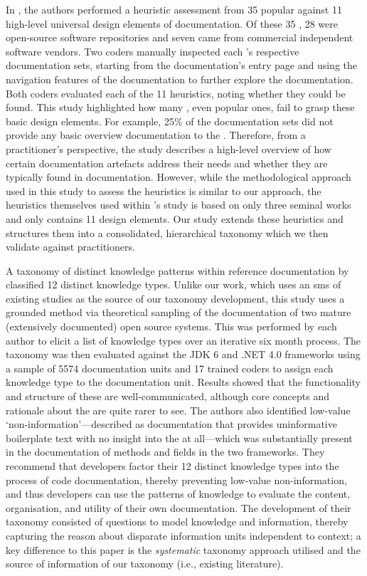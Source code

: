 In \citet{Watson:2012uy}, the authors performed a heuristic assessment from 35 popular  against 11 high-level universal design elements of  documentation. Of these 35 , 28 were open-source software repositories and seven came from commercial independent software vendors. Two coders manually inspected each 's respective documentation sets, starting from the documentation's entry page and using the navigation features of the documentation to further explore the documentation. Both coders evaluated each of the 11 heuristics, noting whether they could be found. This study highlighted how many , even popular ones, fail to grasp these basic design elements. For example, 25\% of the documentation sets did not provide any basic overview documentation to the . Therefore, from a practitioner's perspective, the study describes a high-level overview of how certain documentation artefacts address their needs and whether they are typically found in documentation. However, while the methodological approach used in this study to assess the heuristics is similar to our approach, the heuristics themselves used within \citeauthor{Watson:2012uy}'s study is based on only three seminal works and only contains 11 design elements. Our study extends these heuristics and structures them into a consolidated, hierarchical taxonomy which we then validate against practitioners.

A taxonomy of distinct knowledge patterns within reference documentation by \citet{Maalej2013} classified 12 distinct knowledge types. Unlike our work, which uses an \gls{sms} of existing studies as the source of our taxonomy development, this study uses a grounded method via theoretical sampling of the  documentation of two mature (extensively documented) open source systems. This was performed by each author to elicit a list of knowledge types over an iterative six month process. The taxonomy was then evaluated against the JDK 6 and .NET 4.0 frameworks using a sample of 5574 documentation units and 17 trained coders to assign each knowledge type to the documentation unit. Results showed that the functionality and structure of these  are well-communicated, although core concepts and rationale about the  are quite rarer to see. The authors also identified low-value `non-information'---described as documentation that provides uninformative boilerplate text with no insight into the  at all---which was  substantially present in the documentation of methods and fields in the two frameworks. They recommend that developers factor their 12 distinct knowledge types into the process of code documentation, thereby preventing low-value non-information, and thus developers can use the patterns of knowledge to evaluate the content, organisation, and utility of their own documentation. The development of their taxonomy consisted of questions to model knowledge and information, thereby capturing the reason about disparate information units independent to context; a key difference to this paper is the \textit{systematic} taxonomy approach utilised and the source of information of our taxonomy (i.e., existing literature).

